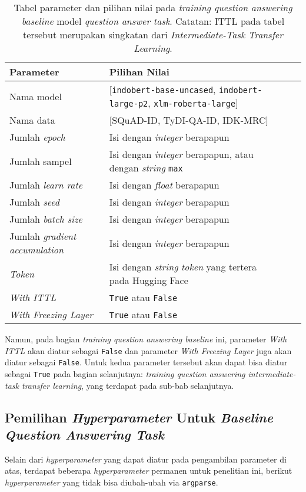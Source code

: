 \begin{table}[h!]
\centering
\begin{tabularx}{\linewidth}{XlXX}
 \toprule
 Parameter & Pilihan Nilai \\
 \midrule
 Nama model & [\texttt{indobert-base-uncased}, \texttt{indobert-large-p2}, \texttt{xlm-roberta-large}] \\  
 Nama data & [SQuAD-ID, TyDI-QA-ID, IDK-MRC] \\
 Jumlah \emph{epoch} & Isi dengan \emph{integer} berapapun \\
 Jumlah sampel & Isi dengan \emph{integer} berapapun, atau dengan \emph{string} \texttt{max} \\
 Jumlah \emph{learn rate} & Isi dengan \emph{float} berapapun \\ 
 Jumlah \emph{seed} & Isi dengan \emph{integer} berapapun \\ 
 Jumlah \emph{batch size} & Isi dengan \emph{integer} berapapun \\ 
 Jumlah \emph{gradient accumulation} & Isi dengan \emph{integer} berapapun \\ 
 \emph{Token} & Isi dengan \emph{string} \emph{token} yang tertera pada Hugging Face \\
 \emph{With ITTL} & \texttt{True} atau \texttt{False} \\
 \emph{With Freezing Layer} & \texttt{True} atau \texttt{False} \\
 \bottomrule
\end{tabularx}
\caption{Tabel parameter dan pilihan nilai pada \emph{training question answering} \emph{baseline} model \emph{question answer task}. Catatan: ITTL pada tabel tersebut merupakan singkatan dari \emph{Intermediate-Task Transfer Learning}.}
\end{table}

Namun, pada bagian \emph{training question answering baseline} ini, parameter \emph{With ITTL} akan diatur sebagai \texttt{False} dan parameter \emph{With Freezing Layer} juga akan diatur sebagai \texttt{False}. Untuk kedua parameter tersebut akan dapat bisa diatur sebagai \texttt{True} pada bagian selanjutnya: \emph{training question answering intermediate-task transfer learning}, yang terdapat pada sub-bab selanjutnya.

\subsection{Pemilihan \emph{Hyperparameter} Untuk \emph{Baseline Question Answering Task}}
\label{4.2.2}
Selain dari \emph{hyperparameter} yang dapat diatur pada pengambilan parameter di atas, terdapat beberapa \emph{hyperparameter} permanen untuk penelitian ini, berikut \emph{hyperparameter} yang tidak bisa diubah-ubah via \texttt{argparse}.

